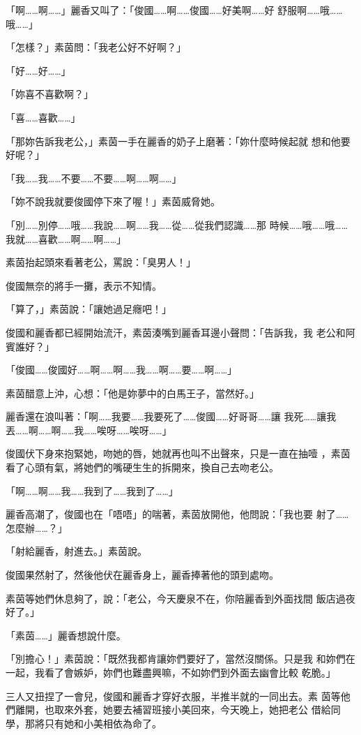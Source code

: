 「啊……啊……」麗香又叫了：「俊國……啊……俊國……好美啊……好
舒服啊……哦……哦……」

「怎樣？」素茵問：「我老公好不好啊？」

「好……好……」

「妳喜不喜歡啊？」

「喜……喜歡……」

「那妳告訴我老公，」素茵一手在麗香的奶子上磨著：「妳什麼時候起就
想和他要好呢？」

「我……我……不要……不要……啊……啊……」

「妳不說我就要俊國停下來了喔！」素茵威脅她。

「別……別停……哦……我說……啊……我……從……從我們認識……那
時候……哦……哦……我就……喜歡……啊……啊……」

素茵抬起頭來看著老公，罵說：「臭男人！」

俊國無奈的將手一攤，表示不知情。

「算了，」素茵說：「讓她過足癮吧！」

俊國和麗香都已經開始流汗，素茵湊嘴到麗香耳邊小聲問：「告訴我，我
老公和阿賓誰好？」

「俊國……俊國好……啊……啊……我……啊……要……啊……」

素茵醋意上沖，心想：「他是妳夢中的白馬王子，當然好。」

麗香還在浪叫著：「啊……我要……我要死了……俊國……好哥哥……讓
我死……讓我丟……啊……啊……我……唉呀……唉呀……」

俊國伏下身來抱緊她，吻她的唇，她就再也叫不出聲來，只是一直在抽噎
，素茵看了心頭有氣，將她們的嘴硬生生的拆開來，換自己去吻老公。

「啊……啊……我……我到了……我到了……」

麗香高潮了，俊國也在「唔唔」的喘著，素茵放開他，他問說：「我也要
射了……怎麼辦……？」

「射給麗香，射進去。」素茵說。

俊國果然射了，然後他伏在麗香身上，麗香捧著他的頭到處吻。

素茵等她們休息夠了，說：「老公，今天慶泉不在，你陪麗香到外面找間
飯店過夜好了。」

「素茵……」麗香想說什麼。

「別擔心！」素茵說：「既然我都肯讓妳們要好了，當然沒關係。只是我
和妳們在一起，我看了會嫉妒，妳們也難盡興嘛，不如妳們到外面去幽會比較
乾脆。」

三人又扭捏了一會兒，俊國和麗香才穿好衣服，半推半就的一同出去。素
茵等他們離開，也取來外套，她要去補習班接小美回來，今天晚上，她把老公
借給同學，那將只有她和小美相依為命了。










